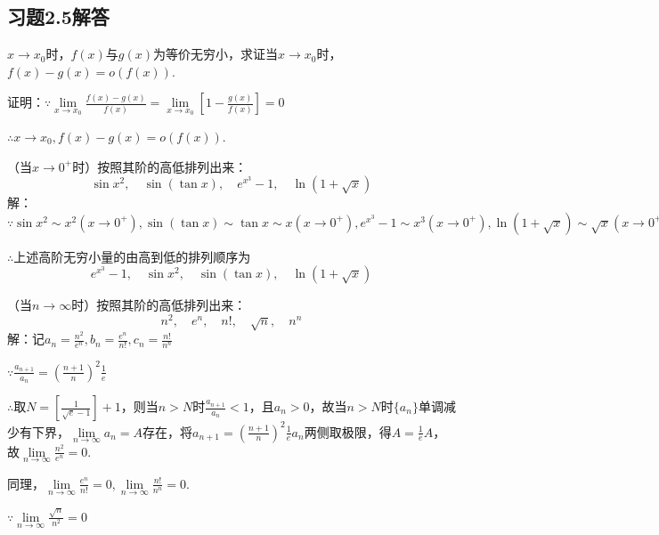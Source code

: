 \documentclass[12pt,UTF8]{ctexart}
\begin{document}
\subsection{习题2.5解答}
\begin{enumerate}
$x\rightarrow x_0$时，$f(x)$与$g(x)$为等价无穷小，求证当$x\rightarrow x_0$时，$f(x)-g(x)=o(f(x))$.

证明：$\because\lim\limits_{x\rightarrow x_0}\frac{f(x)-g(x)}{f(x)}=\lim\limits_{x\rightarrow x_0}[1-\frac{g(x)}{f(x)}]=0$

$\therefore x\rightarrow x_0,f(x)-g(x)=o(f(x))$.

（当$x\rightarrow0^+$时）按照其阶的高低排列出来：
\[\sin x^2,\quad\sin(\tan x),\quad e^{x^3}-1,\quad\ln(1+\sqrt x)\]
解：$\because\sin x^2\sim x^2(x\rightarrow0^+),\sin(\tan x)\sim\tan x\sim x(x\rightarrow0^+),e^{x^3}-1\sim x^3(x\rightarrow0^+),\ln(1+\sqrt x)\sim\sqrt x(x\rightarrow0^+)$

$\therefore$上述高阶无穷小量的由高到低的排列顺序为
\[e^{x^3}-1,\quad\sin x^2,\quad\sin(\tan x),\quad\ln(1+\sqrt x)\]

（当$n\rightarrow\infty$时）按照其阶的高低排列出来：
\[n^2,\quad e^n,\quad n!,\quad\sqrt n,\quad n^n\]
解：记$a_n=\frac{n^2}{e^n},b_n=\frac{e^n}{n!},c_n=\frac{n!}{n^n}$

$\because\frac{a_{n+1}}{a_n}=(\frac{n+1}n)^2\frac1e$

$\therefore$取$N=[\frac1{\sqrt e-1}]+1$，则当$n>N$时$\frac{a_{n+1}}{a_n}<1$，且$a_n>0$，故当$n>N$时$\{a_n\}$单调减少有下界，$\lim\limits_{n\rightarrow\infty} a_n=A$存在，将$a_{n+1}=(\frac{n+1}n)^2\frac1e a_{n}$两侧取极限，得$A=\frac1eA$，故$\lim\limits_{n\rightarrow\infty}\frac{n^2}{e^n}=0$.

同理，$\lim\limits_{n\rightarrow\infty}\frac{e^n}{n!}=0,\lim\limits_{n\rightarrow\infty}\frac{n!}{n^n}=0$.

$\because\lim\limits_{n\rightarrow\infty}\frac{\sqrt n}{n^2}=0$


\end{enumerate}
\end{document}
